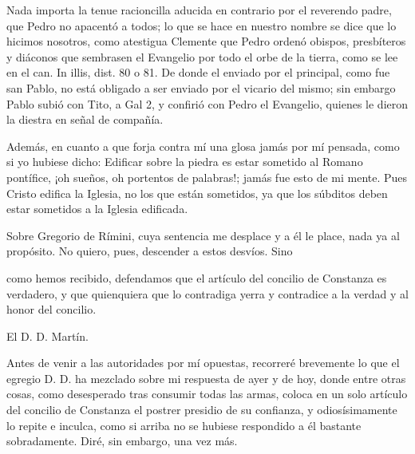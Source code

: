 Nada importa la tenue racioncilla aducida en contrario por el reverendo padre, que Pedro no apacentó a todos; lo que se hace en nuestro nombre se dice que lo hicimos nosotros, como atestigua Clemente que Pedro ordenó obispos, presbíteros y diáconos que sembrasen el Evangelio por todo el orbe de la tierra, como se lee en el can. In illis, dist. 80 o 81. De donde el enviado por el principal, como fue san Pablo, no está obligado a ser enviado por el vicario del mismo; sin embargo Pablo subió con Tito, a Gal 2, y confirió con Pedro el Evangelio, quienes le dieron la diestra en señal de compañía.

Además, en cuanto a que forja contra mí una glosa jamás por mí pensada, como si yo hubiese dicho: Edificar sobre la piedra es estar sometido al Romano pontífice, ¡oh sueños, oh portentos de palabras!; jamás fue esto de mi mente. Pues Cristo edifica la Iglesia, no los que están sometidos, ya que los súbditos deben estar sometidos a la Iglesia edificada.

Sobre Gregorio de Rímini, cuya sentencia me desplace y a él le place, nada ya al propósito. No quiero, pues, descender a estos desvíos. Sino

como hemos recibido, defendamos que el artículo del concilio de Constanza es verdadero, y que quienquiera que lo contradiga yerra y contradice a la verdad y al honor del concilio.

El D. D. Martín.

Antes de venir a las autoridades por mí opuestas, recorreré brevemente lo que el egregio D. D. ha mezclado sobre mi respuesta de ayer y de hoy, donde entre otras cosas, como desesperado tras consumir todas las armas, coloca en un solo artículo del concilio de Constanza el postrer presidio de su confianza, y odiosísimamente lo repite e inculca, como si arriba no se hubiese respondido a él bastante sobradamente. Diré, sin embargo, una vez más.

